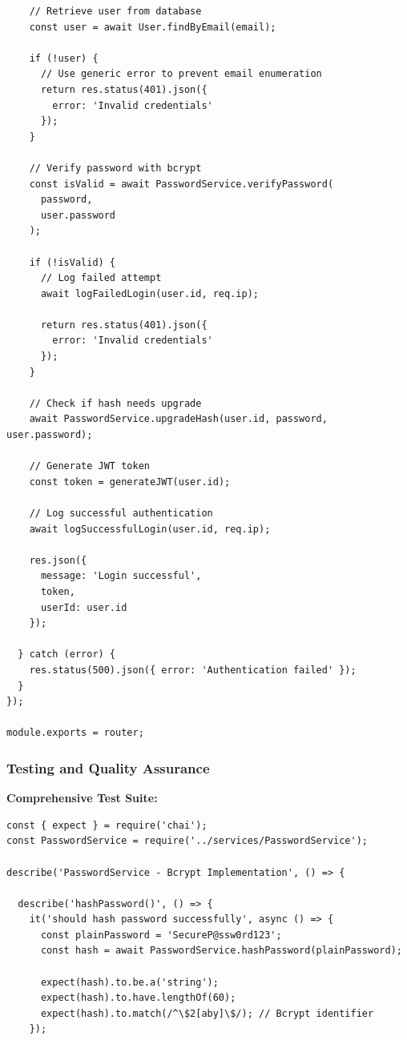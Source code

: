 \documentclass[12pt,a4paper]{article}
\begin{document}
\begin{tcolorbox}[colback=primaryblue!5, colframe=primaryblue, boxrule=1pt, arc=3pt, left=10pt, right=10pt, top=8pt, bottom=8pt]
\begin{verbatim}
    // Retrieve user from database
    const user = await User.findByEmail(email);
    
    if (!user) {
      // Use generic error to prevent email enumeration
      return res.status(401).json({ 
        error: 'Invalid credentials' 
      });
    }
    
    // Verify password with bcrypt
    const isValid = await PasswordService.verifyPassword(
      password, 
      user.password
    );
    
    if (!isValid) {
      // Log failed attempt
      await logFailedLogin(user.id, req.ip);
      
      return res.status(401).json({ 
        error: 'Invalid credentials' 
      });
    }
    
    // Check if hash needs upgrade
    await PasswordService.upgradeHash(user.id, password, user.password);
    
    // Generate JWT token
    const token = generateJWT(user.id);
    
    // Log successful authentication
    await logSuccessfulLogin(user.id, req.ip);
    
    res.json({
      message: 'Login successful',
      token,
      userId: user.id
    });
    
  } catch (error) {
    res.status(500).json({ error: 'Authentication failed' });
  }
});

module.exports = router;
\end{verbatim}

\subsubsection{Testing and Quality Assurance}

\textbf{Comprehensive Test Suite:}

\begin{verbatim}
const { expect } = require('chai');
const PasswordService = require('../services/PasswordService');

describe('PasswordService - Bcrypt Implementation', () => {
  
  describe('hashPassword()', () => {
    it('should hash password successfully', async () => {
      const plainPassword = 'SecureP@ssw0rd123';
      const hash = await PasswordService.hashPassword(plainPassword);
      
      expect(hash).to.be.a('string');
      expect(hash).to.have.lengthOf(60);
      expect(hash).to.match(/^\$2[aby]\$/); // Bcrypt identifier
    });
    

\end{verbatim}
\end{tcolorbox}
\end{document}
